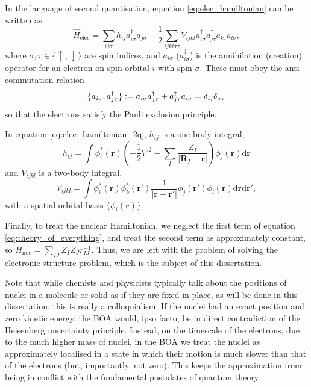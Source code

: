 In the language of second quantisation, equation \eqref{eq:elec_hamiltonian} can be written as
\begin{equation}
\label{eq:elec_hamiltonian_2q}
\hat H_\mathrm{elec} = \sum_{ij\sigma} h_{ij}a_{i\sigma}^\dag a_{j\sigma}+\frac 12 \sum_{ijkl\sigma\tau} V_{ijkl}a_{i\sigma}^\dag a_{j\tau}^\dag a_{k\tau}a_{l\sigma},
\end{equation}
where $\sigma,\tau\in\{\uparrow,\downarrow\}$ are spin indices, and $a_{i\sigma}$ ($a_{i\sigma}^\dag$) is the annihilation (creation) operator for an electron on spin-orbital $i$ with spin $\sigma$. These must obey the anti-commutation relation
\begin{equation}
    \{a_{i\sigma},a_{j\tau}^\dag\}
    \mathrel{\mathop:}=
    a_{i\sigma}a_{j\tau}^\dag + a_{j\tau}^\dag a_{i\sigma}
    =\delta_{ij}\delta_{\sigma\tau}
\end{equation}
so that the electrons satisfy the Pauli exclusion principle.

In equation \ref{eq:elec_hamiltonian_2q}, $h_{ij}$ is a one-body integral,
\begin{equation}
\label{eq:hij}
h_{ij} = \int \phi_i^*(\mathbf{r})\left(-\frac 12 \nabla^2 - \sum_I \frac{Z_I}{|\mathbf{R}_I-\mathbf r|}\right)\phi_j(\mathbf{r})\mathrm{d}\mathbf{r}
\end{equation}
and $V_{ijkl}$ is a two-body integral,
\begin{equation}
V_{ijkl} = \int \phi_i^*(\mathbf{r})\phi_k^*(\mathbf{r}')\frac{1}{|\mathbf{r}-\mathbf{r}'|}\phi_j(\mathbf{r}')\phi_l(\mathbf{r})\mathrm{d}\mathbf{r}\mathrm{d}\mathbf{r}',
\end{equation}
with a spatial-orbital basis $\{\phi_i(\mathbf{r})\}$.

Finally, to treat the nuclear Hamiltonian, we neglect the first term of equation \eqref{eq:theory_of_everything}, and treat the second term as approximately constant, so $\hat H_\mathrm{nuc} = \sum_{IJ} Z_IZ_Jr_{IJ}^{-1}$. Thus, we are left with the problem of solving the electronic structure problem, which is the subject of this dissertation.

Note that while chemists and physicists typically talk about the positions of nuclei in a molecule or solid as if they are fixed in place, as will be done in this dissertation, this is really a colloquialism. If the nuclei had an exact position and zero kinetic energy, the \gls{BOA} would, ipso facto, be in direct contradiction of the Heisenberg uncertainty principle. Instead, on the timescale of the electrons, due to the much higher mass of nuclei, in the \gls{BOA} we treat the nuclei as approximately localised in a state in which their motion is much slower than that of the electrons (but, importantly, not zero). This keeps the approximation from being in conflict with the fundamental postulates of quantum theory.

